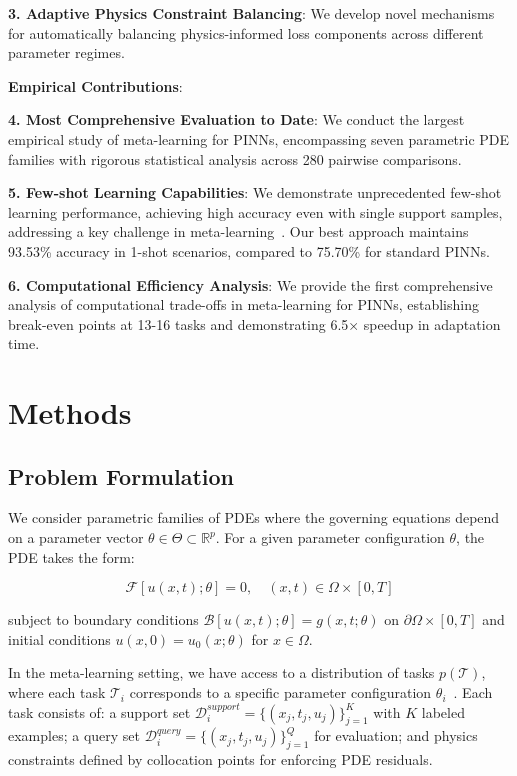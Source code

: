 \documentclass[review]{elsarticle}
\begin{document}
\textbf{3. Adaptive Physics Constraint Balancing}: We develop novel mechanisms for automatically balancing physics-informed loss components across different parameter regimes.

\textbf{Empirical Contributions}:

\textbf{4. Most Comprehensive Evaluation to Date}: We conduct the largest empirical study of meta-learning for PINNs, encompassing seven parametric PDE families with rigorous statistical analysis across 280 pairwise comparisons.

\textbf{5. Few-shot Learning Capabilities}: We demonstrate unprecedented few-shot learning performance, achieving high accuracy even with single support samples, addressing a key challenge in meta-learning~\cite{snell2017prototypical,vinyals2016matching}. Our best approach maintains 93.53\% accuracy in 1-shot scenarios, compared to 75.70\% for standard PINNs.

\textbf{6. Computational Efficiency Analysis}: We provide the first comprehensive analysis of computational trade-offs in meta-learning for PINNs, establishing break-even points at 13-16 tasks and demonstrating 6.5× speedup in adaptation time.

\section{Methods}

\subsection{Problem Formulation}

We consider parametric families of PDEs where the governing equations depend on a parameter vector $\theta \in \Theta \subset \mathbb{R}^p$. For a given parameter configuration $\theta$, the PDE takes the form:

\begin{equation}
\mathcal{F}[u(x,t); \theta] = 0, \quad (x,t) \in \Omega \times [0,T]
\end{equation}

subject to boundary conditions $\mathcal{B}[u(x,t); \theta] = g(x,t; \theta)$ on $\partial\Omega \times [0,T]$ and initial conditions $u(x,0) = u_0(x; \theta)$ for $x \in \Omega$.

In the meta-learning setting, we have access to a distribution of tasks $p(\mathcal{T})$, where each task $\mathcal{T}_i$ corresponds to a specific parameter configuration $\theta_i$~\cite{finn2017model,hospedales2021meta}. Each task consists of: a support set $\mathcal{D}_i^{support} = \{(x_j, t_j, u_j)\}_{j=1}^{K}$ with $K$ labeled examples; a query set $\mathcal{D}_i^{query} = \{(x_j, t_j, u_j)\}_{j=1}^{Q}$ for evaluation; and physics constraints defined by collocation points for enforcing PDE residuals.
\end{document}
